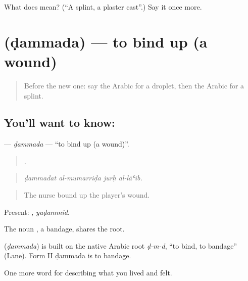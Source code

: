 \begin{tcolorbox}[breakable,colback=teal!4,colframe=teal!35!black,title={Before you move on}]
What does  mean? (\textquotedblleft{}A splint, a plaster cast\textquotedblright{}.) Say it once more.
\end{tcolorbox}
\section[\texorpdfstring{\ar{ضمد} (ḍammada)}{ضمد (ḍammada)}]{ (ḍammada) — to bind up (a wound)}

\label{lesson:AR-C511-dammada}



\begin{quote}
Before the new one: say the Arabic for a droplet, then the Arabic for a splint.
\end{quote}

\subsection*{You'll want to know: }
\textbf{} — \emph{ḍammada} — \textquotedblleft{}to bind up (a wound)\textquotedblright{}.

\begin{quote}
   .
\end{quote}

\begin{quote}
\emph{ḍammadat al-mumarriḍa jurḥ al-lāʿib.}
\end{quote}

\begin{quote}
The nurse bound up the player's wound.
\end{quote}

Present: , \emph{yuḍammid}.

The noun , a bandage, shares the root.

\begin{cousinweb}
\textbf{} (\emph{ḍammada}) is built on the native Arabic root \emph{ḍ-m-d}, \textquotedblleft{}to bind, to bandage\textquotedblright{} (Lane). Form II ḍammada is to bandage.
\end{cousinweb}

\begin{grammarlens}[title={What you've built}]
One more word for describing what you lived and felt.
\end{grammarlens}

